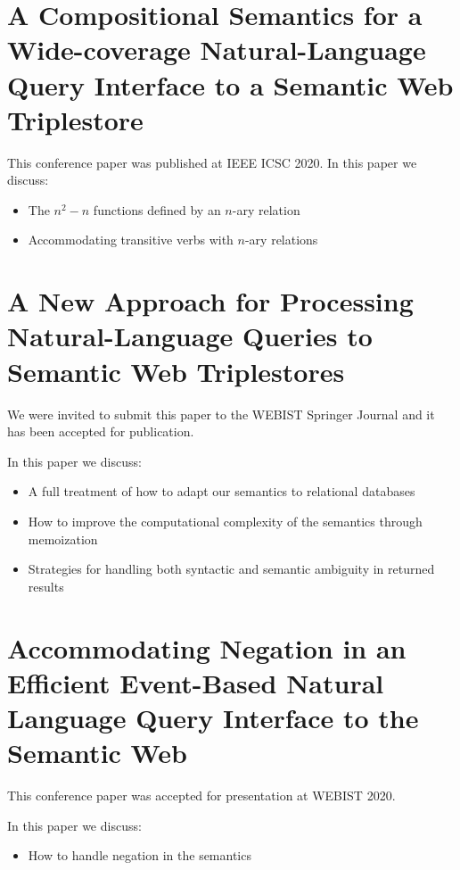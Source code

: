 \documentclass[../main.tex]{subfiles}
\begin{document}
\begin{refsection}
\section{A Compositional Semantics for a Wide-coverage Natural-Language Query Interface to a Semantic Web Triplestore}

This conference paper was published at IEEE ICSC 2020.  In this paper we discuss:

\begin{itemize}
    \item The $n^2 - n$ functions defined by an $n$-ary relation
    \item Accommodating transitive verbs with $n$-ary relations
\end{itemize}


\section{A New Approach for Processing Natural-Language Queries to Semantic Web Triplestores}


We were invited to submit this paper to the WEBIST Springer Journal and it has been accepted for publication.

In this paper we discuss:

\begin{itemize}
    \item A full treatment of how to adapt our semantics to relational databases
    \item How to improve the computational complexity of the semantics through memoization
    \item Strategies for handling both syntactic and semantic ambiguity in returned results
\end{itemize}

\section{Accommodating Negation in an Efficient Event-Based Natural Language Query Interface to the Semantic Web}


This conference paper was accepted for presentation at WEBIST 2020.

In this paper we discuss:

\begin{itemize}
    \item How to handle negation in the semantics
\end{itemize}


\printbibliography[heading=subbibintoc]
\end{refsection}
\end{document}
